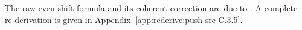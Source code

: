 

The raw even-shift formula and its coherent correction are due to \citet[Proposition~7.8 and Appendix~C, Proposition~C.2]{DuEtAl2026v1}. A complete re-derivation is given in Appendix~\ref{app:rederive:push-src-C.3.5}.



